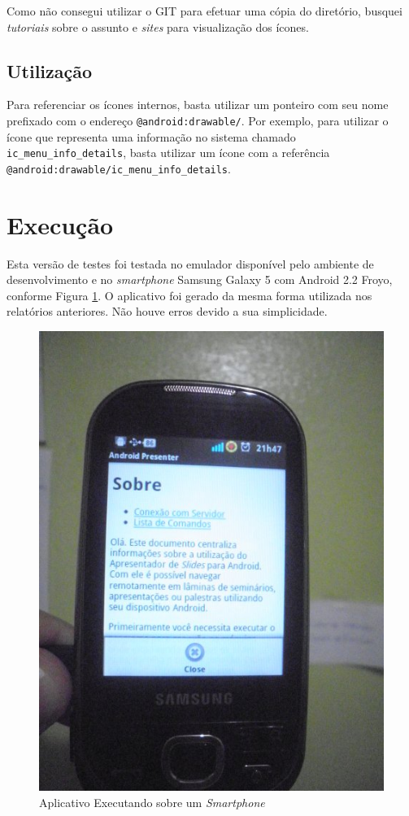 \documentclass{article}
\begin{document}
Como não consegui utilizar o GIT para efetuar uma cópia do diretório, busquei
\emph{tutoriais} sobre o assunto e \emph{sites} para visualização dos ícones.

\subsection{Utilização}

Para referenciar os ícones internos, basta utilizar um ponteiro com seu nome
prefixado com o endereço \texttt{@android:drawable/}. Por exemplo, para utilizar
o ícone que representa uma informação no sistema chamado
\texttt{ic\_menu\_info\_details}, basta utilizar um ícone com a referência
\texttt{@android:drawable/ic\_menu\_info\_details}.

\section{Execução}
\label{sec:execucao}

Esta versão de testes foi testada no emulador disponível pelo ambiente de
desenvolvimento e no \emph{smartphone} Samsung Galaxy 5 com Android 2.2 Froyo,
conforme Figura \ref{fig:smart}. O aplicativo foi gerado da mesma forma
utilizada nos relatórios anteriores. Não houve erros devido a sua simplicidade.

\begin{figure}
    \centering{}
    \includegraphics[scale=0.3]{figura03.jpg}
    \caption{Aplicativo Executando sobre um \emph{Smartphone}}
    \label{fig:smart}
\end{figure}
\end{document}
